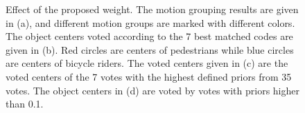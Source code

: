 \begin{figure}
\centering
{}
\caption[Effect of the proposed weight]{Effect of the proposed weight. The motion grouping results are given in (a), and different motion groups are marked with different colors. The object centers voted according to the 7 best matched codes are given in (b). Red circles are centers of pedestrians while blue circles are centers of bicycle riders. The voted centers given in (c) are the voted centers of the 7 votes with the highest defined priors from 35 votes. The object centers in (d) are voted by votes with priors higher than 0.1.}
\label{fig:compa}
\end{figure}


